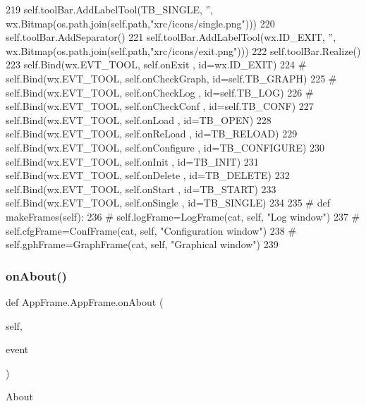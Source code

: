 \begin{DoxyCode}
219         self.toolBar.AddLabelTool(TB\_SINGLE, \textcolor{stringliteral}{''}, wx.Bitmap(os.path.join(self.path,\textcolor{stringliteral}{"xrc/icons/single.png"})))
220         self.toolBar.AddSeparator()
221         self.toolBar.AddLabelTool(wx.ID\_EXIT, \textcolor{stringliteral}{''}, wx.Bitmap(os.path.join(self.path,\textcolor{stringliteral}{"xrc/icons/exit.png"})))
222         self.toolBar.Realize()
223         self.Bind(wx.EVT\_TOOL, self.onExit      , id=wx.ID\_EXIT)
224 \textcolor{comment}{#        self.Bind(wx.EVT\_TOOL, self.onCheckGraph, id=self.TB\_GRAPH)}
225 \textcolor{comment}{#        self.Bind(wx.EVT\_TOOL, self.onCheckLog  , id=self.TB\_LOG)}
226 \textcolor{comment}{#        self.Bind(wx.EVT\_TOOL, self.onCheckConf , id=self.TB\_CONF)}
227         self.Bind(wx.EVT\_TOOL, self.onLoad , id=TB\_OPEN)
228         self.Bind(wx.EVT\_TOOL, self.onReLoad , id=TB\_RELOAD)
229         self.Bind(wx.EVT\_TOOL, self.onConfigure , id=TB\_CONFIGURE)
230         self.Bind(wx.EVT\_TOOL, self.onInit , id=TB\_INIT)
231         self.Bind(wx.EVT\_TOOL, self.onDelete , id=TB\_DELETE)
232         self.Bind(wx.EVT\_TOOL, self.onStart , id=TB\_START)
233         self.Bind(wx.EVT\_TOOL, self.onSingle , id=TB\_SINGLE)
234 
235 \textcolor{comment}{#    def makeFrames(self):}
236 \textcolor{comment}{#        self.logFrame=LogFrame(cat, self, "Log window")}
237 \textcolor{comment}{#        self.cfgFrame=ConfFrame(cat, self, "Configuration window")}
238 \textcolor{comment}{#        self.gphFrame=GraphFrame(cat, self, "Graphical window")}
239         
\end{DoxyCode}
\mbox{\label{classAppFrame_1_1AppFrame_afeb5cc9b92feb69befb4705e8f06f3e2}} 
\subsubsection{\texorpdfstring{on\+About()}{onAbout()}}
{\footnotesize\ttfamily def App\+Frame.\+App\+Frame.\+on\+About (\begin{DoxyParamCaption}\item[{}]{self,  }\item[{}]{event }\end{DoxyParamCaption})}

\begin{DoxyVerb}About\end{DoxyVerb}
 

